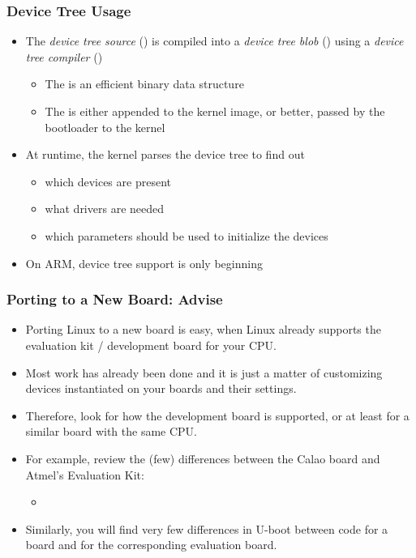 \begin{frame}
  \frametitle{Device Tree Usage}
  \begin{itemize}
  \item The \emph{device tree source} () is compiled into a
    \emph{device tree blob} () using a \emph{device tree
      compiler} ()
    \begin{itemize}
    \item The  is an efficient binary data structure
    \item The  is either appended to the kernel image, or
      better, passed by the bootloader to the kernel
    \end{itemize}
  \item At runtime, the kernel parses the device tree to find out
    \begin{itemize}
    \item which devices are present
    \item what drivers are needed
    \item which parameters should be used to initialize the devices
    \end{itemize}
  \item On ARM, device tree support is only beginning
  \end{itemize}
\end{frame}

\begin{frame}
  \frametitle{Porting to a New Board: Advise}
  \begin{itemize}
  \item Porting Linux to a new board is easy, when Linux already
    supports the evaluation kit / development board for your CPU.
  \item Most work has already been done and it is just a matter of
    customizing devices instantiated on your boards and their
    settings.
  \item Therefore, look for how the development board is supported, or
    at least for a similar board with the same CPU.
  \item For example, review the (few) differences between the Calao
     board and Atmel's  Evaluation Kit:
    \begin{itemize}
    \item {}
    \end{itemize}
  \item Similarly, you will find very few differences in U-boot
    between code for a board and for the corresponding evaluation
    board.
  \end{itemize}
\end{frame}
